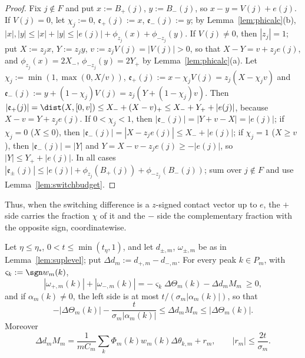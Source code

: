 \begin{proof}
Fix $j\notin F$ and put $x:=B_+(j)$, $y:=B_-(j)$, so $x-y=V(j)+e(j)$.  If
$V(j)=0$, let $\chi_j:=0$, $\mathfrak e_+(j):=x$, $\mathfrak e_-(j):=y$; by
Lemma~\ref{lem:phicalc}(b), $|x|,|y|\le|x|+|y|\le|e(j)|+\phi_{z_j}(x)+
\phi_{-z_j}(y)$.  If $V(j)\ne0$, then $|z_j|=1$; put $X:=z_jx$,
$Y:=z_jy$, $v:=z_jV(j)=|V(j)|>0$, so that $X-Y=v+z_je(j)$, and
$\phi_{z_j}(x)=2X_-$, $\phi_{-z_j}(y)=2Y_+$ by Lemma~\ref{lem:phicalc}(a).
Let $\chi_j:=\min(1,\max(0,X/v))$, $\mathfrak e_+(j):=x-\chi_jV(j)=
z_j(X-\chi_jv)$ and $\mathfrak e_-(j):=y+(1-\chi_j)V(j)=z_j(Y+(1-\chi_j)v)$.
Then $|\mathfrak e_+(j)|=\dist(X,[0,v])\le X_-+(X-v)_+\le X_-+Y_++|e(j)|$,
because $X-v=Y+z_je(j)$.  If $0<\chi_j<1$, then $|\mathfrak e_-(j)|=
|Y+v-X|=|e(j)|$; if $\chi_j=0$ ($X\le0$), then $|\mathfrak e_-(j)|=
|X-z_je(j)|\le X_-+|e(j)|$; if $\chi_j=1$ ($X\ge v$), then $|\mathfrak
e_-(j)|=|Y|$ and $Y=X-v-z_je(j)\ge-|e(j)|$, so $|Y|\le Y_++|e(j)|$.  In all
cases $|\mathfrak e_\pm(j)|\le|e(j)|+\phi_{z_j}(B_+(j))+\phi_{-z_j}(B_-(j))$;
sum over $j\notin F$ and use Lemma~\ref{lem:switchbudget}.
\end{proof}

Thus, when the switching difference is a $z$-signed contact vector up to
$e$, the $+$ side carries the fraction $\chi$ of it and the $-$ side the
complementary fraction with the opposite sign, coordinatewise.

\begin{lemma}\label{lem:peakshift}
Let $\eta\le\eta_*$, $0<t\le\min(t_\eta,1)$, and let $d_{\pm,m}$,
$\omega_{\pm,m}$ be as in Lemma~\ref{lem:suplevel};
put $\Delta d_m:=d_{+,m}-d_{-,m}$.  For every peak $k\in P_m$, with
$\varsigma_k:=\sgn w_m(k)$,
\begin{equation}\label{eq:peakshift}
 |\omega_{+,m}(k)|+|\omega_{-,m}(k)|=-\varsigma_k\Delta\Theta_m(k)-
 \Delta d_mM_m\ \ge0,
\end{equation}
and if $\alpha_m(k)\ne0$, the left side is at most
$t/(\sigma_m|\alpha_m(k)|)$, so that
\[
 -|\Delta\Theta_m(k)|-\frac t{\sigma_m|\alpha_m(k)|}\le\Delta d_mM_m\le
 |\Delta\Theta_m(k)|.
\]
Moreover
\begin{equation}\label{eq:didentity}
 \Delta d_mM_m=\frac1{mC_m}\sum_k\Phi_m(k)w_m(k)\Delta\theta_{k,m}+r_m,
 \qquad|r_m|\le\frac{2t}{\sigma_m}.
\end{equation}
\end{lemma}

